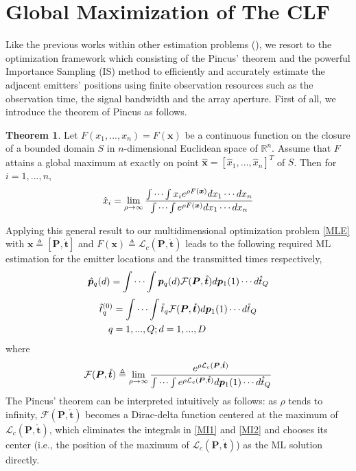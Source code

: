 \documentclass[review]{elsarticle}
\begin{document}
\section{Global Maximization of The CLF}\label{sec3}
Like the previous works within other estimation problems (\cite{ISdoa2008,Kay2000Mean,Saha2002Maximum,Wang2010Maximum,Chen2008Joint}), we resort to the optimization framework which consisting of the Pincus' theorem and the powerful Importance Sampling (IS) method to efficiently and accurately estimate the adjacent emitters' positions using finite observation resources such as the observation time, the signal bandwidth and the array aperture.
First of all, we introduce the theorem of Pincus \cite{Pincus1968A} as follows.
\theoremstyle{definition} \newtheorem{Theorem}{Theorem}
\begin{Theorem}
    Let $F(x_1,...,x_n)=F(\boldsymbol{x})$ be a continuous function on the closure of a bounded domain $S$ in $n$-dimensional Euclidean space of $\mathbb{R}^n$. Assume that $F$ attains a global maximum at exactly on point $\hat{\boldsymbol{x}}=[\hat{x}_1,...,\hat{x}_n]^T$ of $S$. Then for $i=1,...,n$,
    \begin{align}\label{Pincus}
    \hat{x}_i=\lim_{\rho\to \infty}\frac{\idotsint x_i e^{\rho F(\boldsymbol{x})}dx_1\cdots dx_n}{\idotsint e^{\rho F(\boldsymbol{x})}dx_1\cdots dx_n}
    \end{align}
\end{Theorem}
Applying this general result to our multidimensional optimization problem \eqref{MLE} with $\boldsymbol{x}\triangleq[\boldsymbol{P},\mathring{\boldsymbol{t}}]$ and $F(\boldsymbol{x})\triangleq \mathcal{L}_c(\boldsymbol{P},\mathring{\boldsymbol{t}})$ leads to the following required ML estimation for the emitter locations and the transmitted times respectively,
\begin{align}\label{MI1}
    \hat{\boldsymbol{p}}_q(d)=\idotsint \boldsymbol{p}_q(d) \mathcal{F}(\boldsymbol{P},\mathring{\boldsymbol{t}})d\boldsymbol{p}_1(1) \cdots d\mathring{t}_Q
\end{align}
\begin{align}\label{MI2}    
    \hat{t}_q^{(0)}&=\idotsint \mathring{t}_q \mathcal{F}(\boldsymbol{P},\mathring{\boldsymbol{t}})d\boldsymbol{p}_1(1) \cdots d\mathring{t}_Q\\ 
    q&=1,...,Q;d=1,...,D \nonumber
\end{align}
where 
\begin{align}\label{gc}
    \mathcal{F}(\boldsymbol{P},\mathring{\boldsymbol{t}})\triangleq\lim_{\rho\to \infty}\frac{e^{\rho \mathcal{L}_c(\boldsymbol{P},\mathring{\boldsymbol{t}})}}{\idotsint e^{\rho \mathcal{L}_c(\boldsymbol{P},\mathring{\boldsymbol{t}})}d\boldsymbol{p}_1(1) \cdots d\mathring{t}_Q}
\end{align}
The Pincus' theorem can be interpreted intuitively as follows: as $\rho$ tends to infinity, $\mathcal{F}(\boldsymbol{P},\mathring{\boldsymbol{t}})$ becomes a Dirac-delta function centered at the maximum of $\mathcal{L}_c(\boldsymbol{P},\mathring{\boldsymbol{t}})$, which eliminates the integrals in \eqref{MI1} and \eqref{MI2} and chooses its center (i.e., the position of the maximum of $\mathcal{L}_c(\boldsymbol{P},\mathring{\boldsymbol{t}})$) as the ML solution directly. 
\end{document}
